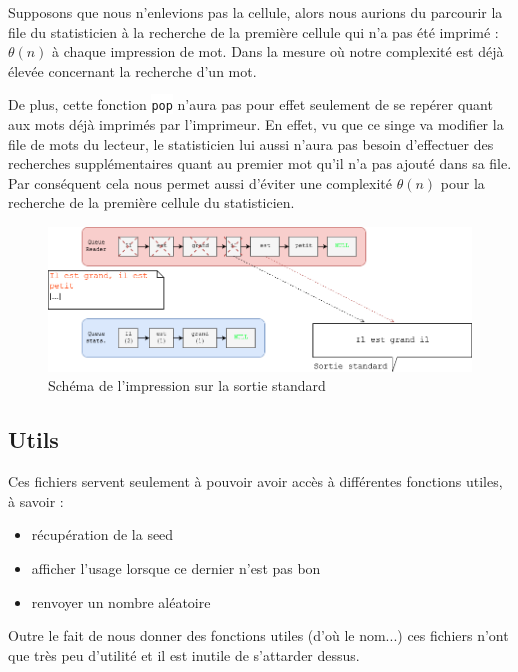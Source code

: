 \documentclass{article}
\newcommand{\inlinecode}[2]{\colorbox{white}{\lstinline[language=#1]$#2$}}
\begin{document}
Supposons que nous n'enlevions pas la cellule, alors nous aurions du parcourir la file du statisticien à la recherche de la première cellule qui n'a pas été imprimé : $\theta(n)$ à chaque impression de mot. Dans la mesure où notre complexité est déjà élevée concernant la recherche d'un mot.

De plus, cette fonction \inlinecode{C}{pop} n'aura pas pour effet seulement de se repérer quant aux mots déjà imprimés par l'imprimeur. En effet, vu que ce singe va modifier la file de mots du lecteur, le statisticien lui aussi n'aura pas besoin d'effectuer des recherches supplémentaires quant au premier mot qu'il n'a pas ajouté dans sa file. Par conséquent cela nous permet aussi d'éviter une complexité $\theta(n)$ pour la recherche de la première cellule du statisticien.

\begin{figure}[ht!]
\centering
\includegraphics[scale=0.5]{schemaimprimeur.png}
\caption{Schéma de l'impression sur la sortie standard}
\label{fig:schema_imprimeur}
\end{figure}


\subsection{Utils}
\label{subsct:utils}

Ces fichiers servent seulement à pouvoir avoir accès à différentes fonctions utiles, à savoir :
\begin{itemize}
    \item récupération de la seed
    \item afficher l'usage lorsque ce dernier n'est pas bon
    \item renvoyer un nombre aléatoire
\end{itemize}

Outre le fait de nous donner des fonctions utiles (d'où le nom...) ces fichiers n'ont que très peu d'utilité et il est inutile de s'attarder dessus.
\end{document}
